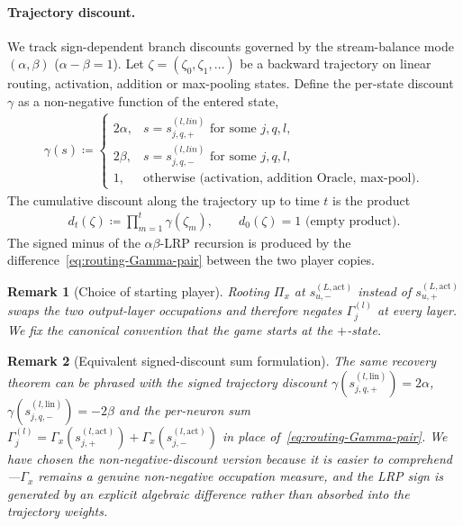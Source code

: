 \documentclass[twoside]{article}
\newcommand{\1}{\mathbf{1}}
\newtheorem{remark}{Remark}
\begin{document}
\paragraph{Trajectory discount.}
We track sign-dependent branch discounts governed by the stream-balance mode $(\alpha, \beta)$
($\alpha-\beta=1$). Let $\zeta = (\zeta_0,\zeta_1,\dots)$ be a backward trajectory on linear
routing, activation, addition or max-pooling states. Define the per-state discount $\gamma$ as a
non-negative function of the entered state,
\begin{align}\label{eq:routing-edge-discount}
    \gamma(s) \coloneqq
    \begin{cases}
        2\alpha, & s = s_{j,q,+}^{(l, lin)} \text{ for some } j,q,l,\\
        2\beta, & s = s_{j,q,-}^{(l, lin)} \text{ for some } j,q,l,\\
        1, & \text{otherwise (activation, addition Oracle, max-pool).}
    \end{cases}
\end{align}
The cumulative discount along the trajectory up to time $t$ is the product
\begin{align}\label{eq:routing-discount}
    d_t(\zeta) \coloneqq \prod_{m=1}^{t} \gamma(\zeta_m),
    \qquad d_0(\zeta) = 1 \text{ (empty product).}
\end{align}
The signed minus of the $\alpha\beta$-\ac{LRP} recursion is produced by the
difference~\eqref{eq:routing-Gamma-pair} between the two player copies.

\begin{remark}[Choice of starting player]\label{rem:starting-player}
Rooting $\Pi_x$ at $s_{u,-}^{(L,\mathrm{act})}$ instead of $s_{u,+}^{(L,\mathrm{act})}$ swaps the
two output-layer occupations and therefore negates $\Gamma^{(l)}_j$ at every layer. We fix the
canonical convention that the game starts at the $+$-state.
\end{remark}

\begin{remark}[Equivalent signed-discount sum formulation]\label{rem:signed-discount-alt}
The same recovery theorem can be phrased with the signed trajectory discount
$\gamma(s_{j,q,+}^{(l,\mathrm{lin})}) = 2\alpha$, $\gamma(s_{j,q,-}^{(l,\mathrm{lin})}) = -2\beta$
and the per-neuron \emph{sum} $\Gamma^{(l)}_j = \Gamma_x(s_{j,+}^{(l,\mathrm{act})}) +
    \Gamma_x(s_{j,-}^{(l,\mathrm{act})})$ in place of~\eqref{eq:routing-Gamma-pair}. We have chosen the
non-negative-discount version because it is easier to comprehend---$\Gamma_x$ remains a genuine
non-negative occupation measure, and the LRP sign is generated by an explicit algebraic difference
rather than absorbed into the trajectory weights.
\end{remark}
\end{document}
